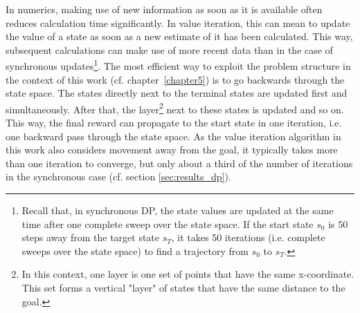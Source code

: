 In numerics, making use of new information as soon as it is available often reduces calculation time significantly. In value iteration, this can mean to update the value of a state as soon as a new estimate of it has been calculated. This way, subsequent calculations can make use of more recent data than in the case of synchronous updates\footnote{Recall that, in synchronous DP, the state values are updated at the same time after one complete sweep over the state space. If the start state $s_0$ is 50 steps away from the target state $s_T$, it takes 50 iterations (i.e. complete sweeps over the state space) to find a trajectory from $s_0$ to $s_T$.}. The most efficient way to exploit the problem structure in the context of this work (cf. chapter~\ref{chapter5}) is to go backwards through the state space. The states directly next to the terminal states are updated first and simultaneously. After that, the layer\footnote{In this context, one layer is one set of points that have the same x-coordinate. This set forms a vertical "layer" of states that have the same distance to the goal.} next to these states is updated and so on. This way, the final reward can propagate to the start state in one iteration, i.e. one backward pass through the state space. As the value iteration algorithm in this work also considers movement away from the goal, it typically takes more than one iteration to converge, but only about a third of the number of iterations in the synchronous case (cf. section \ref{sec:results_dp}).